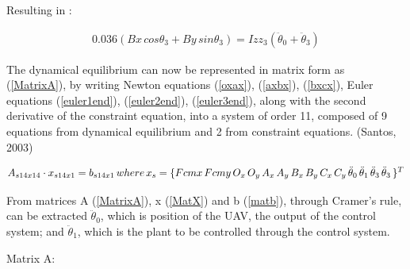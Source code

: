Resulting in :

\begin{equation}\label{euler3end}
\begin{split}
	0.036(Bx\,cos\theta_{{3}} + By\, sin\theta_{{3}}) = Izz_{{3}}(\ddot\theta_{{0}}+\ddot\theta_{{3}} )
	\end{split}
\end{equation}
 
 The dynamical equilibrium can now be represented in matrix form as (\ref{MatrixA}), by writing Newton equations (\ref{oxax}),  (\ref{axbx}), (\ref{bxcx}), Euler equations  (\ref{euler1end}),  (\ref{euler2end}), (\ref{euler3end}), along with the second derivative of the constraint equation, into a system of order 11, composed of 9 equations from dynamical equilibrium and 2 from constraint equations. (Santos, 2003) \cite{santos2001dinamica}

 \begin{equation} \label{matA14}
{A}_{s14x14}\cdot x_{s14x1} = b_{s14x1}
\\\, where\\\, x_s = \{Fcmx \,Fcmy \,O_x\, O_y\,A_x\,A_y\,B_x\,B_y\,C_x\,C_y\,\ddot\theta_0\, \ddot\theta_1\,\ddot\theta_3\,\ddot\theta_3\, \}^T
\end{equation}
 
 From matrices A (\ref{MatrixA}), x (\ref{MatX}) and b (\ref{matb}), through Cramer's rule, can be extracted \( \ddot\theta_0 \), which is position of the UAV, the output of the control system; and \( \ddot\theta_1 \), which is the plant to be controlled through the control system. 
 
 

Matrix A:

